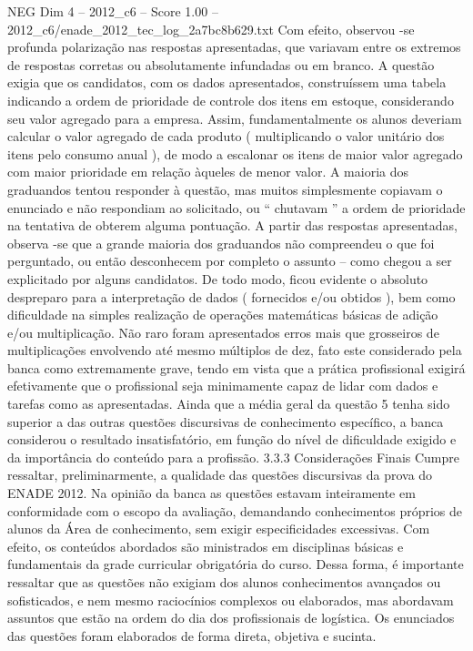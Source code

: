 \begin{textsample}{NEG Dim 4 – 2012\_c6 – Score 1.00 – 2012\_c6/enade\_2012\_tec\_log\_2a7bc8b629.txt}
Com efeito, observou -se profunda polarização nas respostas apresentadas, que variavam entre os extremos de respostas corretas ou absolutamente infundadas ou em branco.
A questão exigia que os candidatos, com os dados apresentados, construíssem uma tabela indicando a ordem de prioridade de controle dos itens em estoque, considerando seu valor agregado para a empresa.
Assim, fundamentalmente os alunos deveriam calcular o valor agregado de cada produto ( multiplicando o valor unitário dos itens pelo consumo anual ), de modo a escalonar os itens de maior valor agregado com maior prioridade em relação àqueles de menor valor.
A maioria dos graduandos tentou responder à questão, mas muitos simplesmente copiavam o enunciado e não respondiam ao solicitado, ou “ chutavam ” a ordem de prioridade na tentativa de obterem alguma pontuação.
A partir das respostas apresentadas, observa -se que a grande maioria dos graduandos não compreendeu o que foi perguntado, ou então desconhecem por completo o assunto – como chegou a ser explicitado por alguns candidatos.
De todo modo, ficou evidente o absoluto despreparo para a interpretação de dados ( fornecidos e/ou obtidos ), bem como dificuldade na simples realização de operações matemáticas básicas de adição e/ou multiplicação.
Não raro foram apresentados erros mais que grosseiros de multiplicações envolvendo até mesmo múltiplos de dez, fato este considerado pela banca como extremamente grave, tendo em vista que a prática profissional exigirá efetivamente que o profissional seja minimamente capaz de lidar com dados e tarefas como as apresentadas.
Ainda que a média geral da questão 5 tenha sido superior a das outras questões discursivas de conhecimento específico, a banca considerou o resultado insatisfatório, em função do nível de dificuldade exigido e da importância do conteúdo para a profissão. 3.3.3 Considerações Finais Cumpre ressaltar, preliminarmente, a qualidade das questões discursivas da prova do ENADE 2012.
Na opinião da banca as questões estavam inteiramente em conformidade com o escopo da avaliação, demandando conhecimentos próprios de alunos da Área de conhecimento, sem exigir especificidades excessivas.
Com efeito, os conteúdos abordados são ministrados em disciplinas básicas e fundamentais da grade curricular obrigatória do curso.
Dessa forma, é importante ressaltar que as questões não exigiam dos alunos conhecimentos avançados ou sofisticados, e nem mesmo raciocínios complexos ou elaborados, mas abordavam assuntos que estão na ordem do dia dos profissionais de logística.
Os enunciados das questões foram elaborados de forma direta, objetiva e sucinta.

\end{textsample}
